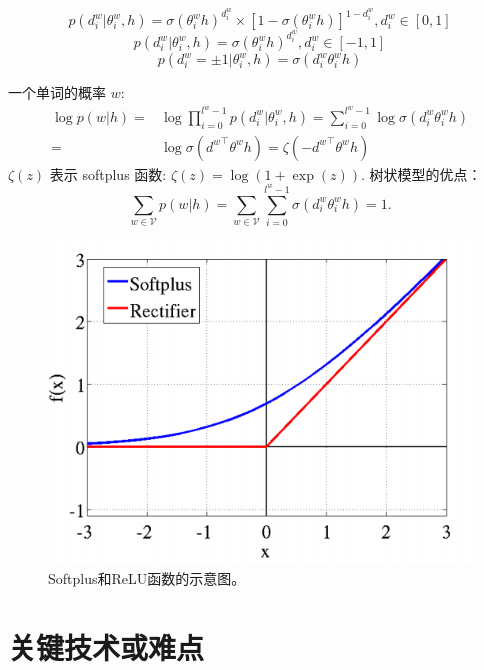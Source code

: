 \documentclass[twoside,UTF8,AutoFakeBold]{buaathesis}
\begin{document}
 \begin{equation}
p(d^w_i|\theta_{i}^w,h) =\sigma(\theta_{i}^w h)^{d_i^w}\times[1-\sigma(\theta_{i}^w h)]^{1-{d_i^w}},d_i^w \in [0,1]
\end{equation}
 \begin{equation}
p(d^w_i|\theta_{i}^w,h) =\sigma(\theta_{i}^w h)^{d_i^w}, d_i^w \in [-1,1]
\end{equation}
\begin{equation}
p(d^w_i=\pm 1|\theta_{i}^w,h) = \sigma({d_i^w}\theta_{i}^w h)
\end{equation}

一个单词的概率 $w$:
\begin{equation}\label{equ:pw}
\begin{split}
 \log p(w|h)=&\log\prod_{i=0}^{l^w-1} p(d^w_i|\theta_{i}^w,h) = \sum_{i=0}^{l^w -1} \log\sigma(d_i^w \theta_{i}^w h)\\
 =&\log\sigma({d^w}^\top \theta^w h)=\zeta(- {d^w}^\top \theta^w h )
 \end{split}
\end{equation}
$\zeta(z)$ 表示 softplus 函数: $\zeta(z)= \log (1+\exp(z))$.
树状模型的优点：
\begin{equation}
\sum_{w\in \mathcal{V}}{p(w|h)}=\sum_{w \in \mathcal{V}}\sum_{i=0}^{l^w-1}{\sigma(d_i^w\theta_{i}^w h)}=1.
\end{equation}


\begin{figure}
  \centering
\includegraphics[width=0.5\linewidth]{./figures/softplus.png}
\caption{Softplus和ReLU函数的示意图。}\label{fig:soft}
\end{figure}
\section{关键技术或难点}
\end{document}
